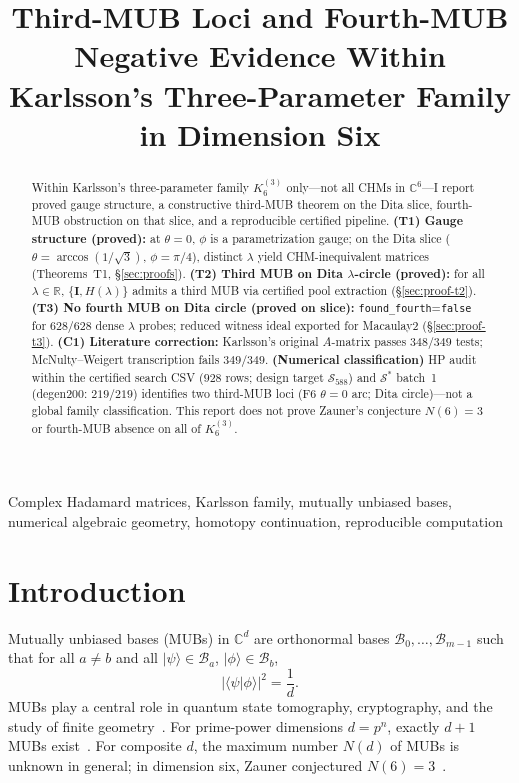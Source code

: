 \documentclass[onecolumn]{IEEEtran}
\begin{document}
\title{Third-MUB Loci and Fourth-MUB Negative Evidence Within Karlsson's Three-Parameter Family in Dimension Six}

\author{%
%
}

\maketitle

\begin{abstract}
Within Karlsson's three-parameter family $K_6^{(3)}$ only---not all CHMs in $\mathbb{C}^6$---I report proved gauge structure, a constructive third-MUB theorem on the Dita slice, fourth-MUB obstruction on that slice, and a reproducible certified pipeline.
\textbf{(T1) Gauge structure (proved):} at $\theta{=}0$, $\phi$ is a parametrization gauge; on the Dita slice ($\theta{=}\arccos(1/\sqrt3)$, $\phi{=}\pi/4$), distinct $\lambda$ yield CHM-inequivalent matrices (Theorems~T1, \S\ref{sec:proofs}).
\textbf{(T2) Third MUB on Dita $\lambda$-circle (proved):} for all $\lambda\in\mathbb{R}$, $\{\mathbf{I},H(\lambda)\}$ admits a third MUB via certified pool extraction (\S\ref{sec:proof-t2}).
\textbf{(T3) No fourth MUB on Dita circle (proved on slice):} \texttt{found\_fourth}=\texttt{false} for $628/628$ dense $\lambda$ probes; reduced witness ideal exported for Macaulay2 (\S\ref{sec:proof-t3}).
\textbf{(C1) Literature correction:} Karlsson's original $A$-matrix passes $348/349$ tests; McNulty--Weigert transcription fails $349/349$.
\textbf{(Numerical classification)} HP audit within the certified search CSV ($928$ rows; design target $\mathcal{S}_{588}$) and $\mathcal{S}^*$ batch~1 (degen200: $219/219$) identifies two third-MUB loci (F6 $\theta{=}0$ arc; Dita circle)---not a global family classification.
This report does not prove Zauner's conjecture $N(6){=}3$ or fourth-MUB absence on all of $K_6^{(3)}$.
\end{abstract}

\begin{IEEEkeywords}
Complex Hadamard matrices, Karlsson family, mutually unbiased bases, numerical algebraic geometry, homotopy continuation, reproducible computation
\end{IEEEkeywords}

\section{Introduction}
\label{sec:intro}

Mutually unbiased bases (MUBs) in $\mathbb{C}^d$ are orthonormal bases $\mathcal{B}_0,\ldots,\mathcal{B}_{m-1}$ such that for all $a\neq b$ and all $|\psi\rangle\in\mathcal{B}_a$, $|\phi\rangle\in\mathcal{B}_b$,
\begin{equation}
    \label{eq:mu}
    \bigl|\langle\psi|\phi\rangle\bigr|^2 = \frac{1}{d}.
\end{equation}
MUBs play a central role in quantum state tomography, cryptography, and the study of finite geometry~\cite{Bengtsson2007, Brierley2009}.
For prime-power dimensions $d=p^n$, exactly $d+1$ MUBs exist~\cite{Ivanovic1981, Wootters1989}.
For composite $d$, the maximum number $N(d)$ of MUBs is unknown in general; in dimension six, Zauner conjectured $N(6)=3$~\cite{Zauner1999, Scott2010}.
\end{document}
